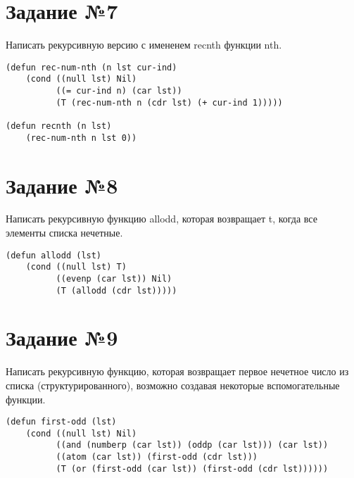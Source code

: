 \section{Задание №7}

Написать рекурсивную версию с имененем recnth функции nth.

\vspace{4mm}
\begin{minipage}{0.92\linewidth}
\begin{lstlisting}
(defun rec-num-nth (n lst cur-ind)
    (cond ((null lst) Nil)
          ((= cur-ind n) (car lst))
          (T (rec-num-nth n (cdr lst) (+ cur-ind 1)))))

(defun recnth (n lst)
    (rec-num-nth n lst 0))
\end{lstlisting}
\end{minipage}

\section{Задание №8}

Написать рекурсивную функцию allodd, которая возвращает t, когда все элементы
списка нечетные.

\vspace{4mm}
\begin{minipage}{0.92\linewidth}
\begin{lstlisting}
(defun allodd (lst)
    (cond ((null lst) T)
          ((evenp (car lst)) Nil)
          (T (allodd (cdr lst)))))
\end{lstlisting}
\end{minipage}

\section{Задание №9}

Написать рекурсивную функцию, которая возвращает первое нечетное число
из списка (структурированного), возможно создавая некоторые вспомогательные
функции.

\vspace{4mm}
\begin{minipage}{0.92\linewidth}
\begin{lstlisting}
(defun first-odd (lst)
    (cond ((null lst) Nil)
          ((and (numberp (car lst)) (oddp (car lst))) (car lst))
          ((atom (car lst)) (first-odd (cdr lst)))
          (T (or (first-odd (car lst)) (first-odd (cdr lst))))))
\end{lstlisting}
\end{minipage}

